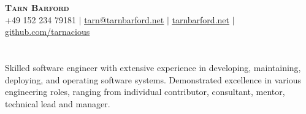 \documentclass[letterpaper,11pt]{article}
\begin{document}
\begin{center}
    \textbf{\Huge \scshape Tarn Barford} \\ \vspace{1pt}
    \small +49 152 234 79181 $|$
    \href{mailto:tarn@tarnbarford.net}{\uline{tarn@tarnbarford.net}} $|$
    \href{https://tarnbarford.net}{\uline{tarnbarford.net}} $|$
    \href{https://github.com/tarnacious}{\uline{github.com/tarnacious}}
\end{center}

\section*{}
  \small { Skilled software engineer with extensive experience in developing, maintaining, deploying, and operating software systems. Demonstrated excellence in various engineering roles, ranging from individual contributor, consultant, mentor, technical lead and manager. }
\end{document}
